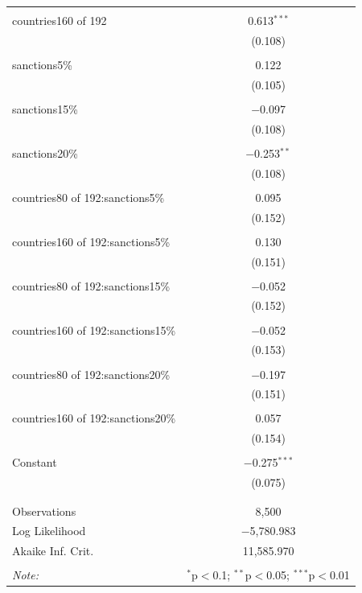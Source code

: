 \documentclass[12pt,letterpaper]{article}
\begin{document}
\begin{enumerate}
\begin{table}[!htbp]
\begin{tabular}{@{\extracolsep{5pt}}lc}
			& \\ 
			countries160 of 192 & 0.613$^{***}$ \\ 
			& (0.108) \\ 
			& \\ 
			sanctions5\% & 0.122 \\ 
			& (0.105) \\ 
			& \\ 
			sanctions15\% & $-$0.097 \\ 
			& (0.108) \\ 
			& \\ 
			sanctions20\% & $-$0.253$^{**}$ \\ 
			& (0.108) \\ 
			& \\ 
			countries80 of 192:sanctions5\% & 0.095 \\ 
			& (0.152) \\ 
			& \\ 
			countries160 of 192:sanctions5\% & 0.130 \\ 
			& (0.151) \\ 
			& \\ 
			countries80 of 192:sanctions15\% & $-$0.052 \\ 
			& (0.152) \\ 
			& \\ 
			countries160 of 192:sanctions15\% & $-$0.052 \\ 
			& (0.153) \\ 
			& \\ 
			countries80 of 192:sanctions20\% & $-$0.197 \\ 
			& (0.151) \\ 
			& \\ 
			countries160 of 192:sanctions20\% & 0.057 \\ 
			& (0.154) \\ 
			& \\ 
			Constant & $-$0.275$^{***}$ \\ 
			& (0.075) \\ 
			& \\ 
			\hline \\[-1.8ex] 
			Observations & 8,500 \\ 
			Log Likelihood & $-$5,780.983 \\ 
			Akaike Inf. Crit. & 11,585.970 \\ 
			\hline 
			\hline \\[-1.8ex] 
			\textit{Note:}  & \multicolumn{1}{r}{$^{*}$p$<$0.1; $^{**}$p$<$0.05; $^{***}$p$<$0.01} \\ 

\end{tabular}
\end{table}
\end{enumerate}
\end{document}
